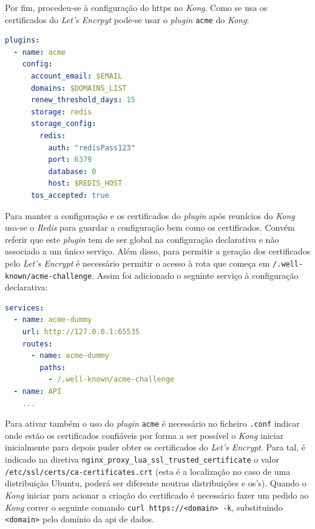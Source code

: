 Por fim, procedeu-se à configuração do \acrshort{https} no \textit{Kong}. Como se usa os certificados do \textit{Let's Encrpyt} pode-se usar o \textit{plugin} \texttt{acme} do \textit{Kong}\cite{kongACME}:
\begin{lstlisting}[language=yaml, caption=Configuração declarativa do \textit{Kong}: \textit{plugin} \texttt{acme}]
plugins:
  - name: acme
    config:
      account_email: $EMAIL
      domains: $DOMAINS_LIST
      renew_threshold_days: 15
      storage: redis
      storage_config:
        redis:
          auth: "redisPass123"
          port: 6379
          database: 0
          host: $REDIS_HOST
      tos_accepted: true
\end{lstlisting}
Para manter a configuração e os certificados do \textit{plugin} após reunícios do \textit{Kong} usa-se o \textit{Redis} para guardar a configuração bem como os certificados. Convém referir que este \textit{plugin} tem de ser global na configuração declarativa e não associado a um único serviço. Além disso, para permitir a geração dos certificados pelo \textit{Let's Encrypt} é necessário permitir o acesso à rota que começa em \texttt{/.well-known/acme-challenge}. Assim foi adicionado o seguinte serviço à configuração declarativa:
\begin{lstlisting}[language=yaml, caption=Configuração declarativa do \textit{Kong}: Serviço para a geração de certificados \acrshort{tls}]
services:
  - name: acme-dummy
    url: http://127.0.0.1:65535
    routes:
      - name: acme-dummy
        paths:
          - /.well-known/acme-challenge
  - name: API
    ...
\end{lstlisting}
Para ativar também o uso do \textit{plugin} \texttt{acme} é necessário no ficheiro \texttt{.conf} indicar onde estão os certificados confiáveis por forma a ser possível o \textit{Kong} iniciar inicialmente para depois puder obter os certificados do \textit{Let's Encrypt}. Para tal, é indicado na diretiva \texttt{nginx\_proxy\_lua\_ssl\_trusted\_certificate} o valor \texttt{/etc/ssl/certs/ca-certificates.crt} (esta é a localização no caso de uma distribuição Ubuntu, poderá ser diferente noutras distribuições e \acrshort{os}'s). Quando o \textit{Kong} iniciar para acionar a criação do certificado é necessário fazer um pedido ao \textit{Kong} correr o seguinte comando \verb|curl https://<domain> -k|, substituindo \verb|<domain>| pelo domínio da \acrshort{api} de dados.

